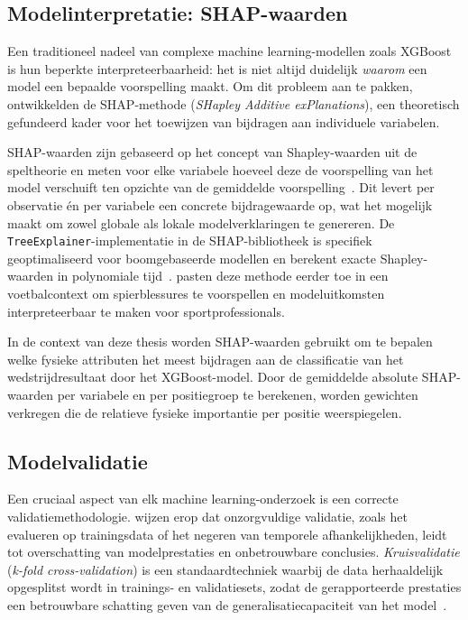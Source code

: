 \subsection{Modelinterpretatie: SHAP-waarden}
 
Een traditioneel nadeel van complexe machine learning-modellen zoals XGBoost is hun beperkte interpreteerbaarheid: het is niet altijd duidelijk \textit{waarom} een model een bepaalde voorspelling maakt. Om dit probleem aan te pakken, ontwikkelden \textcite{lundberg-2017} de SHAP-methode (\textit{SHapley Additive exPlanations}), een theoretisch gefundeerd kader voor het toewijzen van bijdragen aan individuele variabelen.
 
SHAP-waarden zijn gebaseerd op het concept van Shapley-waarden uit de speltheorie en meten voor elke variabele hoeveel deze de voorspelling van het model verschuift ten opzichte van de gemiddelde voorspelling~\autocite{lundberg-2017}. Dit levert per observatie én per variabele een concrete bijdragewaarde op, wat het mogelijk maakt om zowel globale als lokale modelverklaringen te genereren. De \texttt{TreeExplainer}-implementatie in de SHAP-bibliotheek is specifiek geoptimaliseerd voor boomgebaseerde modellen en berekent exacte Shapley-waarden in polynomiale tijd~\autocite{lundberg-2017}. \textcite{CalderonDiaz2023_ExplainableML_Soccer} pasten deze methode eerder toe in een voetbalcontext om spierblessures te voorspellen en modeluitkomsten interpreteerbaar te maken voor sportprofessionals.
 
In de context van deze thesis worden SHAP-waarden gebruikt om te bepalen welke fysieke attributen het meest bijdragen aan de classificatie van het wedstrijdresultaat door het XGBoost-model. Door de gemiddelde absolute SHAP-waarden per variabele en per positiegroep te berekenen, worden gewichten verkregen die de relatieve fysieke importantie per positie weerspiegelen.
 
\subsection{Modelvalidatie}
 
Een cruciaal aspect van elk machine learning-onderzoek is een correcte validatiemethodologie. \textcite{DavisEtAl2024} wijzen erop dat onzorgvuldige validatie, zoals het evalueren op trainingsdata of het negeren van temporele afhankelijkheden, leidt tot overschatting van modelprestaties en onbetrouwbare conclusies. \textit{Kruisvalidatie} (\textit{k-fold cross-validation}) is een standaardtechniek waarbij de data herhaaldelijk opgesplitst wordt in trainings- en validatiesets, zodat de gerapporteerde prestaties een betrouwbare schatting geven van de generalisatiecapaciteit van het model~\autocite{geron-2023,DavisEtAl2024}.
 
